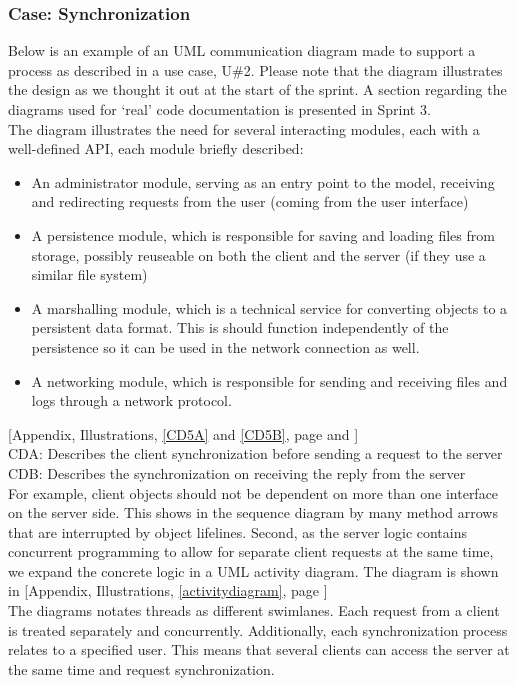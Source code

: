 \subsubsection{Case: Synchronization}
Below is an example of an UML communication diagram made to support a process as described in a use case, U\#2. Please note that the diagram illustrates the design as we thought it out at the start of the sprint. A section regarding the diagrams used for ‘real' code documentation is presented in Sprint 3. \\
The diagram illustrates the need for several interacting modules, each with a well-defined API, each module briefly described:\\
\begin{itemize}
\item An administrator module, serving as an entry point to the model, receiving and redirecting requests from the user (coming from the user interface)
\item A persistence module, which is responsible for saving and loading files from storage, possibly reuseable on both the client and the server (if they use a similar file system)
\item A marshalling module, which is a technical service for converting objects to a persistent data format. This is should function independently of the persistence so it can be used in the network connection as well.
\item A networking module, which is responsible for sending and receiving files and logs through a network protocol.
\end{itemize}
[Appendix, Illustrations, \ref{CD5A} and \ref{CD5B}, page \pageref{CD5A} and \pageref{CD5B}]\\
\newline
CDA: Describes the client synchronization before sending a request to the server\\
CDB: Describes the synchronization on receiving the reply from the server\\
\newline
For example, client objects should not be dependent on more than one interface on the server side. This shows in the sequence diagram by many method arrows that are interrupted by object lifelines. Second, as the server logic contains concurrent programming to allow for separate client requests at the same time, we expand the concrete logic in a UML activity diagram. The diagram is shown in [Appendix, Illustrations, \ref{activitydiagram}, page \pageref{activitydiagram}]\\
\newline
The diagrams notates threads as different swimlanes. Each request from a client is treated separately and concurrently. Additionally, each synchronization process relates to a specified user. This means that several clients can access the server at the same time and request synchronization.\\

